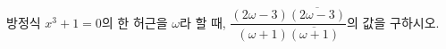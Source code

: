 방정식 $x^3+1=0$의 한 허근을 $\omega$라 할 때, $\dfrac{(2\omega-3)\overline{(2\omega-3)}}{(\omega+1)\overline{(\omega+1)}}$의 값을 구하시오. 
